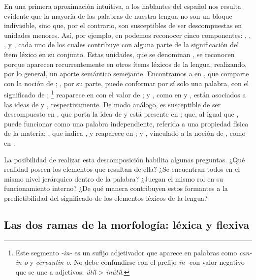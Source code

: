 En una primera aproximación intuitiva, a los hablantes del español nos resulta
evidente que la mayoría de las palabras de nuestra lengua no son un bloque
indivisible, sino que, por el contrario, son susceptibles de ser descompuestas
en unidades menores. Así, por ejemplo, en  podemos reconocer
cinco componentes: , , ,  y
, cada uno de los cuales contribuye con alguna parte de la
significación del ítem léxico en su conjunto. Estas unidades, que se denominan
, se reconocen porque aparecen recurrentemente en otros ítems
léxicos de la lengua, realizando, por lo general, un aporte semántico semejante.
Encontramos a  en , que comparte con
 la noción de ; , por su
parte, puede conformar por sí solo una palabra, con el significado de
; \footnote{Este segmento
\textit{-in-} es un sufijo adjetivador que aparece en palabras como
\textit{can-in-o} y \textit{cervantin-o}. No debe confundirse con el prefijo
\textit{in-} con valor negativo que se une a adjetivos: \textit{útil} >
\textit{inútil}.} reaparece en  con el valor de ;
 y , como en  y , están
asociados a las ideas de  y ,
respectivamente. De modo análogo,  es susceptible de ser
descompuesto en , que porta la idea de  y
está presente en ;  que, al igual que ,
puede funcionar como una palabra independiente, referida a una propiedad física
de la materia; , que indica , y reaparece en
; y , vinculado a la noción de , como en .

La posibilidad de realizar esta descomposición habilita algunas preguntas. ¿Qué
realidad poseen los elementos que resultan de ella? ¿Se encuentran todos en el
mismo nivel jerárquico dentro de la palabra? ¿Juegan el mismo rol en su
funcionamiento interno? ¿De qué manera contribuyen estos formantes a la
predictibilidad del significado de los elementos léxicos de la lengua?

\subsection{Las dos ramas de la morfología: léxica y flexiva}\label{sec:04-ramas}

